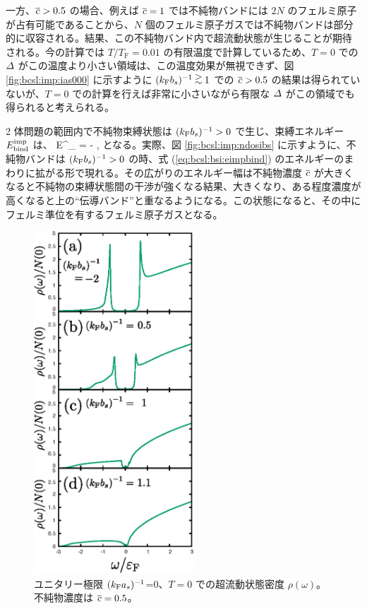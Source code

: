 一方、$\overline{c}>0.5$ の場合、例えば $\overline{c}=1$ では不純物バンドには $2N$ のフェルミ原子が占有可能であることから、$N$ 個のフェルミ原子ガスでは不純物バンドは部分的に収容される。結果、この不純物バンド内で超流動状態が生じることが期待される。今の計算では $T/T_{\text{F}} = 0.01$ の有限温度で計算しているため、$T=0$ での $\varDelta$ がこの温度より小さい領域は、この温度効果が無視できず、図 \ref{fig:bcsl:imp:ias000} に示すように $\bskfi\gtsim 1$ での $\overline{c}>0.5$ の結果は得られていないが、$T=0$ での計算を行えば非常に小さいながら有限な $\varDelta$ がこの領域でも得られると考えられる。

2 体問題の範囲内で不純物束縛状態は $(k_{\text{F}} b_s)^{-1}>0$ で生じ、束縛エネルギー $E^{\text{imp}}_{\text{bind}}$ は、
\beq
E^{\imp}_{} = - ,\label{eq:bcsl:bsi:eimpbind}
\eeq
となる。実際、図 \ref{fig:bcsl:imp:ndosibs} に示すように、不純物バンドは $(k_{\text{F}} b_s)^{-1}>0$ の時、式 (\ref{eq:bcsl:bsi:eimpbind}) のエネルギーのまわりに拡がる形で現れる。その広がりのエネルギー幅は不純物濃度 $\overline{c}$ が大きくなると不純物の束縛状態間の干渉が強くなる結果、大きくなり、ある程度濃度が高くなると上の“伝導バンド”と重なるようになる。この状態になると、その中にフェルミ準位を有するフェルミ原子ガスとなる。


\begin{figure}[t]
\centering
\includegraphics[width=60mm]{eps/bcsl-dos-c0500s.eps}
\caption{ユニタリー極限 $(k_{\text{F}} a_s)^{-1}$=0、$T=0$ での超流動状態密度 $\rho(\omega)$。不純物濃度は $\overline{c}=0.5$。}
\label{fig:bcsl:imp:bdosc0500ias000}
\end{figure}


